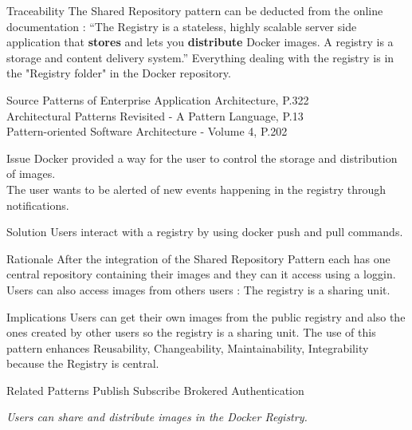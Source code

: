 \begin{patdescription}
\item[Traceability]
The Shared Repository pattern can be deducted from the online documentation : \cite{dockregistry} ``The Registry is a stateless, highly scalable server side application that \textbf{stores} and lets you \textbf{distribute} Docker images. A registry is a storage and content delivery system.''
Everything dealing with the registry is in the "Registry folder" in the Docker repository.


\item[Source]
Patterns of Enterprise Application Architecture, P.322 \cite{eaa}\\
Architectural Patterns Revisited - A Pattern Language, P.13 \cite{avgeriou2005architectural}\\
Pattern-oriented Software Architecture - Volume 4, P.202 \cite{wiley4}

\item[Issue]
Docker provided a way for the user to control the storage and distribution of images. \\
The user wants to be alerted of new events happening in the registry through notifications. %


\item[Solution] %
Users interact with a registry by using docker push and pull commands. %

\item[Rationale] %
 After the integration of the Shared Repository Pattern each has one central repository containing their images and they can it access using a loggin.
 Users can also access images from others users : The registry is a sharing unit. \\
 
 \item [Implications]
Users can get their own images from the public registry and also the ones created by other users so the registry is a sharing unit. %
The use of this pattern enhances Reusability, Changeability, Maintainability, Integrability because the Registry is central.

\item [Related Patterns]
Publish Subscribe 
Brokered Authentication

\textit{Users can share and distribute images in the Docker Registry.}
 
\end{patdescription}

